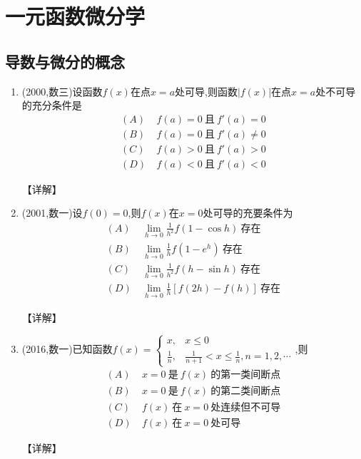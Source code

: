 \documentclass[12pt, a4paper, oneside, UTF8]{ctexbook}
\begin{document}

\else
\fi

\chapter{一元函数微分学}

\section{导数与微分的概念}

\begin{enumerate}[label=\arabic*.]
    \item (2000,数三)设函数$f(x)$在点$x=a$处可导,则函数$|f(x)|$在点$x=a$处不可导的充分条件是
    \begin{align*}
        (A)&\ f(a)=0\ \text{且}\ f'(a)=0 \\
        (B)&\ f(a)=0\ \text{且}\ f'(a)\neq0 \\
        (C)&\ f(a)>0\ \text{且}\ f'(a)>0 \\
        (D)&\ f(a)<0\ \text{且}\ f'(a)<0
    \end{align*}
    
    \begin{solution}
    【详解】
    \end{solution}
    
    \item (2001,数一)设$f(0)=0$,则$f(x)$在$x=0$处可导的充要条件为
    \begin{align*}
        (A)&\ \lim_{h\to0}\frac{1}{h^2}f(1-\cos h)\ \text{存在} \\
        (B)&\ \lim_{h\to0}\frac{1}{h}f(1-e^h)\ \text{存在} \\
        (C)&\ \lim_{h\to0}\frac{1}{h^2}f(h-\sin h)\ \text{存在} \\
        (D)&\ \lim_{h\to0}\frac{1}{h}[f(2h)-f(h)]\ \text{存在}
    \end{align*}
    
    \begin{solution}
    【详解】
    \end{solution}
    
    \item (2016,数一)已知函数$f(x)=\begin{cases}
        x, & x\leq0 \\
        \frac{1}{n}, & \frac{1}{n+1}<x\leq\frac{1}{n},n=1,2,\cdots
    \end{cases}$,则
    \begin{align*}
        (A)&\ x=0\ \text{是}\ f(x)\ \text{的第一类间断点} \\
        (B)&\ x=0\ \text{是}\ f(x)\ \text{的第二类间断点} \\
        (C)&\ f(x)\ \text{在}\ x=0\ \text{处连续但不可导} \\
        (D)&\ f(x)\ \text{在}\ x=0\ \text{处可导}
    \end{align*}
    
    \begin{solution}
    【详解】
    \end{solution}
\end{enumerate}
\end{document}
